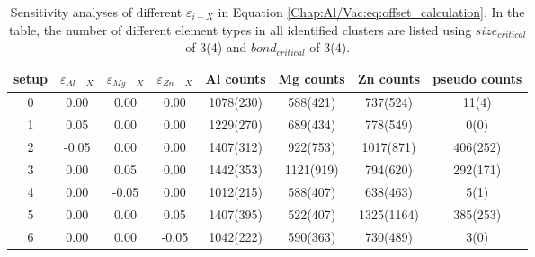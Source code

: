 \begin{table}[!htbp]
\centering
\caption[Sensitivity analyses of different $\varepsilon_{i-X}$.]{Sensitivity analyses of different $\varepsilon_{i-X}$ in Equation \ref{Chap:Al/Vac:eq:offset_calculation}. In the table, the number of different element types in all identified clusters are listed using $size_{critical}$ of 3(4) and $bond_{critical}$ of 3(4).}
\label{Chap:Al/Vac:tab:pseudo1}
\begin{tabular}{cccccccc}
\\
\hline
\hline
setup & $\varepsilon_{Al-X}$  & $\varepsilon_{Mg-X}$  & $\varepsilon_{Zn-X}$ & Al counts & Mg counts & Zn counts & pseudo counts\\
\hline
0 &  0.00    &  0.00       &  0.00 & 1078(230) & 588(421)  &  737(524)  & 11(4)                \\
1 &  0.05    &  0.00       &  0.00 & 1229(270) &  689(434) &   778(549) & 0(0)                \\
2 & -0.05    &  0.00       &  0.00 & 1407(312) & 922(753)  & 1017(871)  & 406(252)                \\
3 &  0.00    &  0.05       &  0.00 & 1442(353) & 1121(919) & 794(620)   & 292(171)                \\
4 &  0.00    & -0.05       &  0.00 & 1012(215) &  588(407) &  638(463)  & 5(1)                \\
5 &  0.00    &  0.00       &  0.05 & 1407(395) & 522(407)  & 1325(1164) & 385(253)                \\
6 &  0.00    &  0.00       & -0.05 & 1042(222) &  590(363) &  730(489)  & 3(0)                \\

\hline
\hline
\end{tabular}
\end{table}

